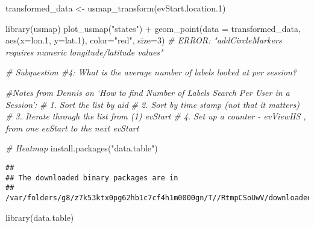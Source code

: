 \documentclass[
]{article}
\newenvironment{Shaded}{\begin{snugshade}}{\end{snugshade}}
\newcommand{\AttributeTok}[1]{\textcolor[rgb]{0.77,0.63,0.00}{#1}}
\newcommand{\CommentTok}[1]{\textcolor[rgb]{0.56,0.35,0.01}{\textit{#1}}}
\newcommand{\DecValTok}[1]{\textcolor[rgb]{0.00,0.00,0.81}{#1}}
\newcommand{\FloatTok}[1]{\textcolor[rgb]{0.00,0.00,0.81}{#1}}
\newcommand{\FunctionTok}[1]{\textcolor[rgb]{0.00,0.00,0.00}{#1}}
\newcommand{\NormalTok}[1]{#1}
\newcommand{\OtherTok}[1]{\textcolor[rgb]{0.56,0.35,0.01}{#1}}
\newcommand{\SpecialCharTok}[1]{\textcolor[rgb]{0.00,0.00,0.00}{#1}}
\newcommand{\StringTok}[1]{\textcolor[rgb]{0.31,0.60,0.02}{#1}}
\begin{document}
\begin{Shaded}
\begin{Highlighting}[]
\NormalTok{transformed\_data }\OtherTok{\textless{}{-}}  \FunctionTok{usmap\_transform}\NormalTok{(evStart.location}\FloatTok{.1}\NormalTok{)}

\FunctionTok{library}\NormalTok{(usmap)}
\FunctionTok{plot\_usmap}\NormalTok{(}\StringTok{"states"}\NormalTok{) }\SpecialCharTok{+} 
  \FunctionTok{geom\_point}\NormalTok{(}\AttributeTok{data =}\NormalTok{ transformed\_data, }
  \FunctionTok{aes}\NormalTok{(}\AttributeTok{x=}\NormalTok{lon}\FloatTok{.1}\NormalTok{, }\AttributeTok{y=}\NormalTok{lat}\FloatTok{.1}\NormalTok{),}
  \AttributeTok{color=}\StringTok{"red"}\NormalTok{,}
  \AttributeTok{size=}\DecValTok{3}\NormalTok{)}
\CommentTok{\# ERROR: "addCircleMarkers requires numeric longitude/latitude values" }
\end{Highlighting}
\end{Shaded}

\begin{Shaded}
\begin{Highlighting}[]
\CommentTok{\# Subquestion \#4: What is the average number of labels looked at per session? }

\CommentTok{\#Notes from Dennis on ‘How to find Number of Labels Search Per User in a Session’:}
\CommentTok{\# 1. Sort the list by aid }
\CommentTok{\# 2. Sort by time stamp (not that it matters)}
\CommentTok{\# 3. Iterate through the list from (1) evStart }
\CommentTok{\# 4. Set up a counter {-} evViewHS , from one evStart to the next evStart }
\end{Highlighting}
\end{Shaded}

\begin{Shaded}
\begin{Highlighting}[]
\CommentTok{\# Heatmap}
\FunctionTok{install.packages}\NormalTok{(}\StringTok{"data.table"}\NormalTok{)}
\end{Highlighting}
\end{Shaded}

\begin{verbatim}
## 
## The downloaded binary packages are in
##  /var/folders/g8/z7k53ktx0pg62hb1c7cf4h1m0000gn/T//RtmpCSoUwV/downloaded_packages
\end{verbatim}

\begin{Shaded}
\begin{Highlighting}[]
\FunctionTok{library}\NormalTok{(data.table)}
\end{Highlighting}
\end{Shaded}
\end{document}
